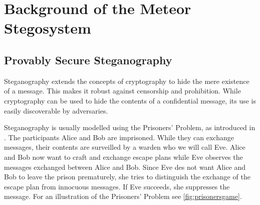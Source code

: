\chapter{Background of the Meteor Stegosystem}
\label{chap:previous-work}

\section{Provably Secure Steganography}
\label{sec:prov-sec-steg}

Steganography extends the concepts of cryptography to hide the mere existence of a message.
This makes it robust against censorship and prohibition.
While cryptography can be used to hide the contents of a confidential message, its use is easily discoverable by adversaries.


Steganography is usually modelled using the Prisoners' Problem, as introduced in \cite{Simmons1983}.
The participants Alice and Bob are imprisoned.
While they can exchange messages, their contents are surveilled by a warden who we will call Eve.
Alice and Bob now want to craft and exchange escape plans while Eve observes the messages exchanged between Alice and Bob.
Since Eve des not want Alice and Bob to leave the prison prematurely, she tries to distinguish the exchange of the escape plan from innocuous messages.
If Eve succeeds, she suppresses the message.
For an illustration of the Prisoners' Problem see \autoref{fig:prisonersgame}.

